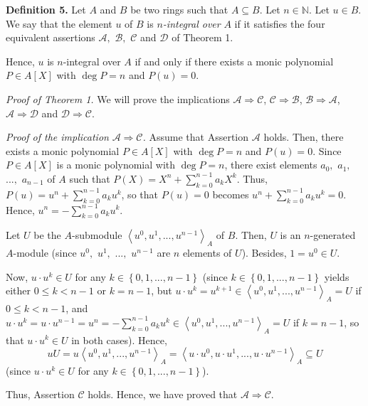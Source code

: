 \documentclass[12pt,final,notitlepage,onecolumn]{article}%
\begin{document}
\textbf{Definition 5.} Let $A$ and $B$ be two rings such that $A\subseteq B$.
Let $n\in\mathbb{N}$. Let $u\in B$. We say that the element $u$ of $B$ is
$n$\textit{-integral over }$A$ if it satisfies the four equivalent assertions
$\mathcal{A},$ $\mathcal{B},$ $\mathcal{C}$ and $\mathcal{D}$ of Theorem 1.

Hence, $u$ is $n$-integral over $A$ if and only if there exists a monic
polynomial $P\in A\left[  X\right]  $ with $\deg P=n$ and $P\left(  u\right)
=0$.

\textit{Proof of Theorem 1.} We will prove the implications $\mathcal{A}%
\Longrightarrow\mathcal{C}$, $\mathcal{C}\Longrightarrow\mathcal{B}$,
$\mathcal{B}\Longrightarrow\mathcal{A}$, $\mathcal{A}\Longrightarrow
\mathcal{D}$ and $\mathcal{D}\Longrightarrow\mathcal{C}$.

\textit{Proof of the implication }$\mathcal{A}\Longrightarrow\mathcal{C}%
$\textit{.} Assume that Assertion $\mathcal{A}$ holds. Then, there exists a
monic polynomial $P\in A\left[  X\right]  $ with $\deg P=n$ and $P\left(
u\right)  =0$. Since $P\in A\left[  X\right]  $ is a monic polynomial with
$\deg P=n$, there exist elements $a_{0},$ $a_{1},$ $...,$ $a_{n-1}$ of $A$
such that $P\left(  X\right)  =X^{n}+\sum\limits_{k=0}^{n-1}a_{k}X^{k}$. Thus,
$P\left(  u\right)  =u^{n}+\sum\limits_{k=0}^{n-1}a_{k}u^{k}$, so that
$P\left(  u\right)  =0$ becomes $u^{n}+\sum\limits_{k=0}^{n-1}a_{k}u^{k}=0$.
Hence, $u^{n}=-\sum\limits_{k=0}^{n-1}a_{k}u^{k}$.

Let $U$ be the $A$-submodule $\left\langle u^{0},u^{1},...,u^{n-1}%
\right\rangle _{A}$ of $B$. Then, $U$ is an $n$-generated $A$-module (since
$u^{0},$ $u^{1},$ $...,$ $u^{n-1}$ are $n$ elements of $U$). Besides,
$1=u^{0}\in U$.

Now, $u\cdot u^{k}\in U$ for any $k\in\left\{  0,1,...,n-1\right\}  $ (since
$k\in\left\{  0,1,...,n-1\right\}  $ yields either $0\leq k<n-1$ or $k=n-1$,
but $u\cdot u^{k}=u^{k+1}\in\left\langle u^{0},u^{1},...,u^{n-1}\right\rangle
_{A}=U$ if $0\leq k<n-1$, and $u\cdot u^{k}=u\cdot u^{n-1}=u^{n}%
=-\sum\limits_{k=0}^{n-1}a_{k}u^{k}\in\left\langle u^{0},u^{1},...,u^{n-1}%
\right\rangle _{A}=U$ if $k=n-1$, so that $u\cdot u^{k}\in U$ in both cases).
Hence,%
\[
uU=u\left\langle u^{0},u^{1},...,u^{n-1}\right\rangle _{A}=\left\langle u\cdot
u^{0},u\cdot u^{1},...,u\cdot u^{n-1}\right\rangle _{A}\subseteq U
\]
(since $u\cdot u^{k}\in U$ for any $k\in\left\{  0,1,...,n-1\right\}  $).

Thus, Assertion $\mathcal{C}$ holds. Hence, we have proved that $\mathcal{A}%
\Longrightarrow\mathcal{C}$.
\end{document}
